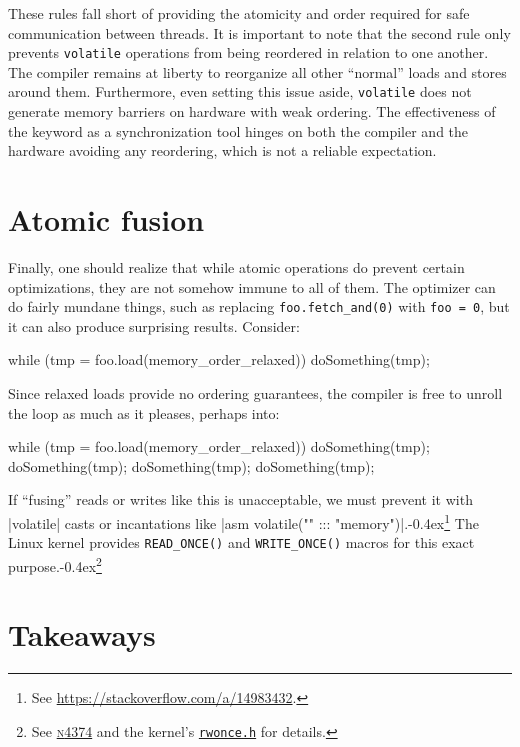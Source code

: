 \documentclass[fontsize=10pt, oneside]{scrartcl}
\newcommand{\punckern}{\kern-0.4ex}
\newcommand{\monobox}[1]{\mbox{\texttt{#1}}}
\newcommand{\keyword}[1]{\monobox{\color{darkGreen}#1}}
\begin{document}
These rules fall short of providing the atomicity and order required for safe communication between threads.
It is important to note that the second rule only prevents \keyword{volatile} operations from being reordered in relation to one another.
The compiler remains at liberty to reorganize all other ``normal'' loads and stores around them.
Furthermore, even setting this issue aside,
\keyword{volatile} does not generate memory barriers on hardware with weak ordering.
The effectiveness of the keyword as a synchronization tool hinges on both the compiler and the hardware avoiding any reordering,
which is not a reliable expectation.
\section{Atomic fusion}
\label{fusing}

Finally, one should realize that while atomic operations do prevent certain optimizations,
they are not somehow immune to all of them.
The optimizer can do fairly mundane things, such as replacing
\monobox{foo.fetch\_and(0)} with \monobox{foo = 0},
but it can also produce surprising results.
Consider:
\begin{cppcode}
while (tmp = foo.load(memory_order_relaxed)) {
    doSomething(tmp);
}
\end{cppcode}
Since relaxed loads provide no ordering guarantees,
the compiler is free to unroll the loop as much as it pleases,
perhaps into:
\begin{cppcode}
while (tmp = foo.load(memory_order_relaxed)) {
    doSomething(tmp);
    doSomething(tmp);
    doSomething(tmp);
    doSomething(tmp);
}
\end{cppcode}
If ``fusing'' reads or writes like this is unacceptable,
we must prevent it
with \cpp|volatile| casts or incantations like \cpp|asm volatile("" ::: "memory")|.\punckern\footnote{See
\url{https://stackoverflow.com/a/14983432}.}
The Linux kernel provides \monobox{READ\_ONCE()} and \monobox{WRITE\_ONCE()}
macros for this exact purpose.\punckern\footnote{See
\href{https://www.open-std.org/jtc1/sc22/wg21/docs/papers/2015/n4374.html}{\textsc{n}4374}
and the kernel's
\href{https://elixir.bootlin.com/linux/latest/source/include/asm-generic/rwonce.h}{\texttt{rwonce.h}} for details.}

\section{Takeaways}
\end{document}
